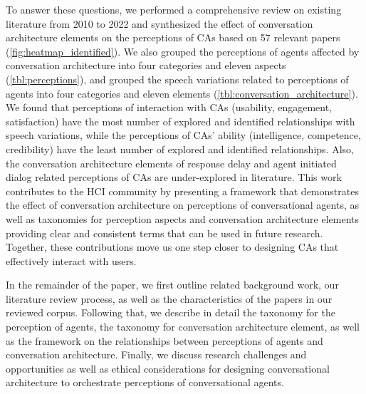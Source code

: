 To answer these questions, we performed a comprehensive review on existing literature from 2010 to 2022 and synthesized the effect of conversation architecture elements on the perceptions of CAs based on 57 relevant papers (\autoref{fig:heatmap_identified}). We also grouped the perceptions of agents affected by conversation architecture into four categories and eleven aspects (\autoref{tbl:perceptions}), and grouped the speech variations related to perceptions of agents into four categories and eleven elements (\autoref{tbl:conversation_architecture}). 
We found that perceptions of interaction with CAs (usability, engagement, satisfaction) have the most number of explored and identified relationships with speech variations, while the perceptions of CAs' ability (intelligence, competence, credibility) have the least number of explored and identified relationships. Also, the conversation architecture elements of response delay and agent initiated dialog related perceptions of CAs are under-explored in literature.
This work contributes to the HCI community by presenting a framework that demonstrates the effect of conversation architecture on perceptions of conversational agents, as well as taxonomies for perception aspects and conversation architecture elements providing clear and consistent terms that can be used in future research. Together, these contributions move us one step closer to designing CAs that effectively interact with users. 

In the remainder of the paper, we first outline related background work, our literature review process, as well as the characteristics of the papers in our reviewed corpus. Following that, we describe in detail the taxonomy for the perception of agents, the taxonomy for conversation architecture element, as well as the framework on the relationships between perceptions of agents and conversation architecture. Finally, we discuss research challenges and opportunities as well as ethical considerations for designing conversational architecture to orchestrate perceptions of conversational agents.